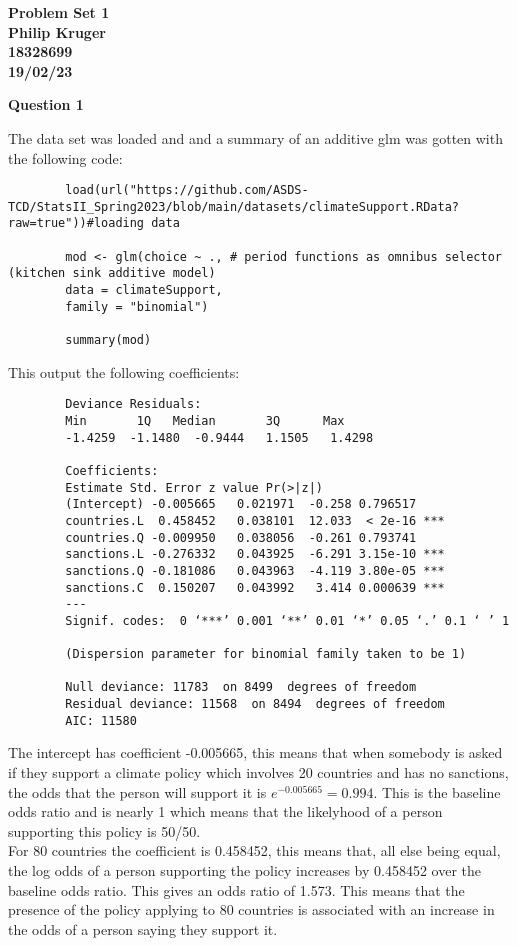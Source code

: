 \documentclass{article}
\begin{document}
	
	\begin{center}
		\textbf{
			{\LARGE Problem Set 1}\\
			Philip Kruger\\
			18328699\\
			19/02/23\\
		}
	\end{center}
	\vspace{10mm}
	\textbf{\Large Question 1\\}
	
	The data set was loaded and and a summary of an additive glm was gotten with the following code:
	\begin{verbatim}
		load(url("https://github.com/ASDS-TCD/StatsII_Spring2023/blob/main/datasets/climateSupport.RData?raw=true"))#loading data
		
		mod <- glm(choice ~ ., # period functions as omnibus selector (kitchen sink additive model)
		data = climateSupport, 
		family = "binomial")
		
		summary(mod)
	\end{verbatim}
	This output the following coefficients:
	\begin{verbatim}
		Deviance Residuals: 
		Min       1Q   Median       3Q      Max  
		-1.4259  -1.1480  -0.9444   1.1505   1.4298  
		
		Coefficients:
		Estimate Std. Error z value Pr(>|z|)    
		(Intercept) -0.005665   0.021971  -0.258 0.796517    
		countries.L  0.458452   0.038101  12.033  < 2e-16 ***
		countries.Q -0.009950   0.038056  -0.261 0.793741    
		sanctions.L -0.276332   0.043925  -6.291 3.15e-10 ***
		sanctions.Q -0.181086   0.043963  -4.119 3.80e-05 ***
		sanctions.C  0.150207   0.043992   3.414 0.000639 ***
		---
		Signif. codes:  0 ‘***’ 0.001 ‘**’ 0.01 ‘*’ 0.05 ‘.’ 0.1 ‘ ’ 1
		
		(Dispersion parameter for binomial family taken to be 1)
		
		Null deviance: 11783  on 8499  degrees of freedom
		Residual deviance: 11568  on 8494  degrees of freedom
		AIC: 11580
	\end{verbatim}
	The intercept has coefficient -0.005665, this means that when somebody is asked if they support a climate policy which involves 20 countries and has no sanctions, the odds that the person will support it is $e^{-0.005665} = 0.994$. This is the baseline odds ratio and is nearly 1 which means that the likelyhood of a person supporting this policy is 50/50.\\
	For 80 countries the coefficient is 0.458452, this means that, all else being equal, the log odds of a person supporting the policy increases by 0.458452 over the baseline odds ratio. This gives an odds ratio of 1.573. This means that the presence of the policy applying to 80 countries is associated with an increase in the odds of a person saying they support it.\\
\end{document}

